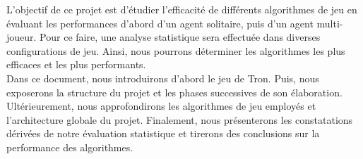 L'objectif de ce projet est d'étudier l'efficacité de différents algorithmes de jeu en évaluant les 
performances d'abord d'un agent solitaire, puis d'un agent multi-joueur. Pour ce faire, 
une analyse statistique sera effectuée dans diverses configurations de jeu. Ainsi, 
nous pourrons déterminer les algorithmes les plus efficaces et les plus performants.\\

Dans ce document, nous introduirons d'abord le jeu de Tron. Puis, nous exposerons la structure du projet et 
les phases successives de son élaboration. Ultérieurement, nous approfondirons les algorithmes de jeu employés 
et l'architecture globale du projet. Finalement, nous présenterons les constatations dérivées de notre évaluation 
statistique et tirerons des conclusions sur la performance des algorithmes.